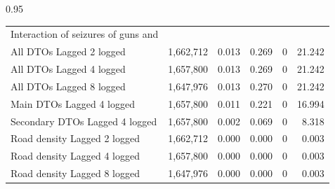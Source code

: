 \documentclass[12pt,letterpaper]{article}
\begin{document}
\begin{table}[h!]
\begin{spacing}{0.95}
\begin{tabular}{lrrrrr}
	Interaction of seizures of guns and	&		&		&		&		&		 \\
	\hspace{1em} All DTOs Lagged 2 logged	&	 1,662,712 	&	0.013	&	0.269	&	0	&	21.242	 \\
	\hspace{1em} All DTOs Lagged 4 logged	&	 1,657,800 	&	0.013	&	0.269	&	0	&	21.242	 \\
	\hspace{1em} All DTOs Lagged 8 logged	&	 1,647,976 	&	0.013	&	0.270	&	0	&	21.242	 \\
	\hspace{1em} Main DTOs Lagged 4 logged	&	 1,657,800 	&	0.011	&	0.221	&	0	&	16.994	 \\
	\hspace{1em} Secondary DTOs Lagged 4 logged	&	 1,657,800 	&	0.002	&	0.069	&	0	&	8.318	 \\
	\hspace{1em} Road density Lagged 2 logged	&	 1,662,712 	&	0.000	&	0.000	&	0	&	0.003	 \\
	\hspace{1em} Road density Lagged 4 logged	&	 1,657,800 	&	0.000	&	0.000	&	0	&	0.003	 \\
	\hspace{1em} Road density Lagged 8 logged	&	 1,647,976 	&	0.000	&	0.000	&	0	&	0.003	 \\

    
    
 \hline
\end{tabular}
\end{spacing}
\end{table}
   
    
\newpage
\end{document}
